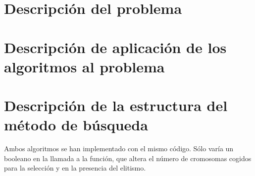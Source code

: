 \documentclass[a4paper, 11pt]{article}
\begin{document}
  \maketitle
  \tableofcontents
  \newpage

  \section{Descripción del problema}

    

  \section{Descripción de aplicación de los algoritmos al problema}
    
  \section{Descripción de la estructura del método de búsqueda}
    Ambos algoritmos se han implementado con el mismo código. Sólo varía un booleano en la llamada a la función, que altera el número de cromosomas cogidos para la selección y en la presencia del elitismo.
\end{document}
